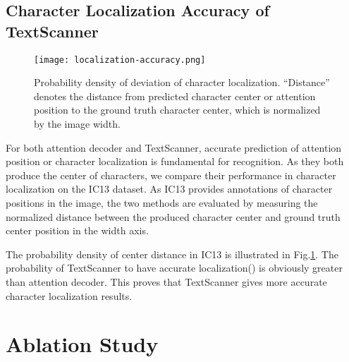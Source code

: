 \documentclass[letterpaper]{article} \usepackage{aaai20}  \usepackage{times}  \usepackage{helvet} \usepackage{courier}  \usepackage[hyphens]{url}  \usepackage{graphicx} \urlstyle{rm} \def\UrlFont{\rm}  \usepackage{graphicx}  \frenchspacing  \setlength{\pdfpagewidth}{8.5in}  \setlength{\pdfpageheight}{11in}
\begin{document}
\subsection{Character Localization Accuracy of TextScanner}

\begin{figure}[t]
\centering
\texttt{[image: localization-accuracy.png]}
\caption{Probability density of deviation of character localization. ``Distance'' denotes the distance from predicted character center or attention position to the ground truth character center, which is normalized by the image width.}
\label{fig:localization}
\end{figure}

For both attention decoder and TextScanner, accurate prediction of attention position or character localization is fundamental for recognition. As they both produce the center of characters, we compare their performance in character localization on the IC13 dataset. As IC13 provides annotations of character positions in the image, the two methods are evaluated by measuring the normalized distance  between the produced character center and ground truth center position in the width axis.

The probability density of center distance in IC13 is illustrated in Fig.\ref{fig:localization}. The probability of TextScanner to have accurate localization() is obviously greater than attention decoder. This proves that TextScanner gives more accurate character localization results.

\section{Ablation Study}

\begin{table}[ht]
    \centering
    \caption{Recognition performance with different settings. ``Geo'' denotes the geometry branch, ``Ord'' denotes word formation using the order maps.}
    \label{tab:geometry}
\end{table}
\end{document}
